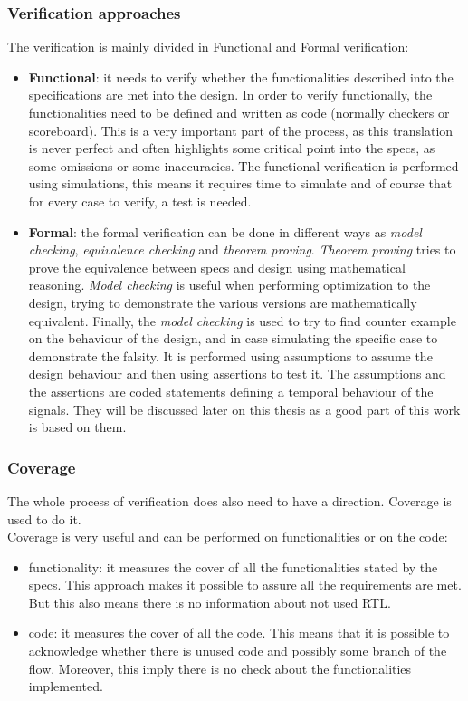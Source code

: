 \subsubsection{Verification approaches}
The verification is mainly divided in Functional and Formal verification:
\begin{itemize}
    \item \textbf{Functional}: it needs to verify whether the functionalities described into the specifications are met into the design. In order to verify functionally, the functionalities need to be defined and written as code (normally checkers or scoreboard). This is a very important part of the process, as this translation is never perfect and often highlights some critical point into the specs, as some omissions or some inaccuracies. The functional verification is performed using simulations, this means it requires time to simulate and of course that for every case to verify, a test is needed.
    
    \item \textbf{Formal}: the formal verification can be done in different ways as \textit{model checking}, \textit{equivalence checking} and \textit{theorem proving}. \textit{Theorem proving} tries to prove the equivalence between specs and design using mathematical reasoning. \textit{Model checking} is useful when performing optimization to the design, trying to demonstrate the various versions are mathematically equivalent. Finally, the \textit{model checking} is used to try to find counter example on the behaviour of the design, and in case simulating the specific case to demonstrate the falsity. It is performed using assumptions to assume the design behaviour and then using assertions to test it. The assumptions and the assertions are coded statements defining a temporal behaviour of the signals. They will be discussed later on this thesis as a good part of this work is based on them.
\end{itemize}

\bigskip

\subsubsection{Coverage}
The whole process of verification does also need to have a direction. Coverage is used to do it. \\

Coverage is very useful and can be performed on functionalities or on the code:
\begin{itemize}
    \item functionality: it measures the cover of all the functionalities stated by the specs. This approach makes it possible to assure all the requirements are met. But this also means there is no information about not used RTL.
    
    \item code: it measures the cover of all the code. This means that it is possible to acknowledge whether there is unused code and possibly some branch of the flow. Moreover, this imply there is no check about the functionalities implemented.

\end{itemize}

